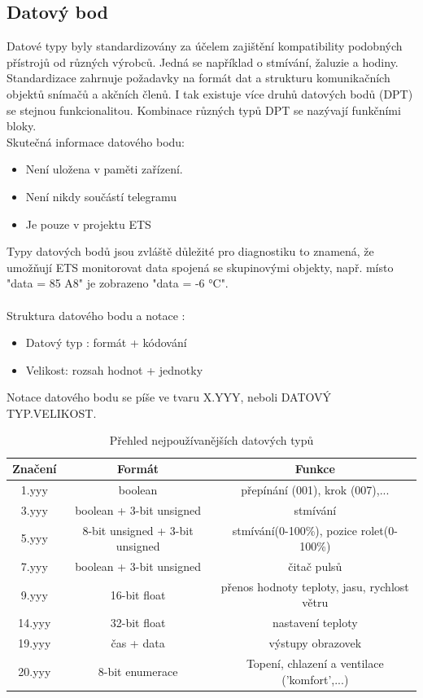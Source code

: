 \subsection{Datový bod}
Datové typy byly standardizovány za účelem zajištění kompatibility podobných přístrojů od různých výrobců. Jedná se například o stmívání, žaluzie a hodiny. Standardizace zahrnuje požadavky na formát dat a strukturu komunikačních objektů snímačů a akčních členů. I tak existuje více druhů datových bodů (DPT) se stejnou funkcionalitou. Kombinace různých typů DPT se nazývají funkčními bloky. \cite{Celkovy prehled}
\\Skutečná informace datového bodu:
\begin{itemize}
    \item Není uložena v paměti zařízení.
    \item Není nikdy součástí telegramu
    \item Je pouze v projektu ETS\\
\end{itemize}
Typy datových bodů jsou zvláště důležité pro diagnostiku to znamená, že umožňují ETS monitorovat data spojená se skupinovými objekty, např. místo "data = 85 A8" je zobrazeno "data = -6 °C". \cite{Datapoint}\\
\\Struktura datového bodu a notace \cite{Datapoint}:
\begin{itemize}
    \item Datový typ : formát + kódování
    \item Velikost: rozsah hodnot + jednotky
\end{itemize}
Notace datového bodu se píše ve tvaru X.YYY, neboli DATOVÝ TYP.VELIKOST.

\begin{table}[h]
 \caption[Přehled nejpoužívanějších datových typů]{Přehled nejpoužívanějších datových typů}
   \small
    \centering
	  \begin{tabular}{|c|c|c|}
	    \hline
	    Značení & Formát  & Funkce  \\
	    \hline\hline
	    1.yyy & boolean & přepínání (001), krok (007),... \\
	    \hline
	    3.yyy & boolean + 3-bit unsigned & stmívání \\
	    \hline
	    5.yyy & 8-bit unsigned + 3-bit unsigned & stmívání(0-100\%), pozice rolet(0-100\%)\\
	    \hline
	    7.yyy & boolean + 3-bit unsigned & čitač pulsů \\
	    \hline
	    9.yyy & 16-bit float & přenos hodnoty teploty, jasu, rychlost větru \\
	    \hline
	    14.yyy & 32-bit float & nastavení teploty\\
	    \hline
	    19.yyy & čas + data & výstupy obrazovek \\
	    \hline
	    20.yyy & 8-bit enumerace & Topení, chlazení a ventilace ('komfort',...) \\
	    \hline
	  \end{tabular}
\end{table}

